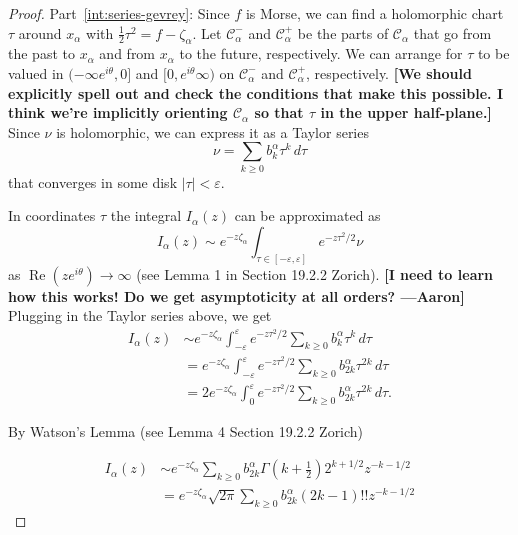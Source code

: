 \documentclass[11pt,a4paper,twoside,leqno,noamsfonts]{amsart}
\numberwithin{equation}{section}
\begin{document}
\begin{proof}
Part~\eqref{int:series-gevrey}: Since $f$ is Morse, we can find a holomorphic chart $\tau$ around $x_\alpha$ with $\tfrac{1}{2} \tau^2 = f - \zeta_\alpha$. Let $\mathcal{C}^-_\alpha$ and $\mathcal{C}^+_\alpha$ be the parts of $\mathcal{C}_\alpha$ that go from the past to $x_\alpha$ and from $x_\alpha$ to the future, respectively. We can arrange for $\tau$ to be valued in $(-\infty e^{i\theta}, 0]$ and $[0, e^{i\theta}\infty)$ on $\mathcal{C}^-_\alpha$ and $\mathcal{C}^+_\alpha$, respectively. \textbf{[We should explicitly spell out and check the conditions that make this possible. I think we're implicitly orienting $\mathcal{C}_\alpha$ so that $\tau$ in the upper half-plane.]} Since $\nu$ is holomorphic, we can express it as a Taylor series
\[ \nu = \sum_{k \ge 0} b_k^\alpha \tau^k\,d\tau \]
that converges in some disk $|\tau| < \varepsilon$.


In coordinates $\tau $ the integral $I_\alpha(z)$ can be approximated as 
\[ I_\alpha(z) \sim  e^{-z\zeta_\alpha}\int_{\tau \in [-\varepsilon, \varepsilon]} e^{-z\tau^2/2} \nu \]
as $\operatorname{Re}(ze^{i\theta}) \to \infty$ (see Lemma 1 in Section 19.2.2  Zorich). \textbf{[I need to learn how this works! Do we get asymptoticity at all orders? ---Aaron]} Plugging in the Taylor series above, we get
\begin{align*}
 I_\alpha(z) & \sim e^{-z\zeta_\alpha}\int_{-\varepsilon}^\varepsilon e^{-z\tau^2/2} \sum_{k \ge 0} b_k^\alpha \tau^k\,d\tau \\
& = e^{-z\zeta_\alpha}\int_{-\varepsilon}^\varepsilon e^{-z\tau^2/2} \sum_{k \ge 0} b_{2k}^\alpha \tau^{2k}\,d\tau\\
& = 2e^{-z\zeta_\alpha}\int_{0}^\varepsilon e^{-z\tau^2/2} \sum_{k \ge 0} b_{2k}^\alpha \tau^{2k}\,d\tau.
\end{align*}


By Watson's Lemma (see Lemma 4 Section 19.2.2 Zorich)

\begin{align*}
I_\alpha(z) &\sim e^{-z\zeta_\alpha}\sum_{k \ge 0} b_{2k}^\alpha \Gamma\left(k+\tfrac{1}{2}\right)2^{k+1/2}z^{-k-1/2}\\
&= e^{-z\zeta_\alpha}\sqrt{2\pi}\sum_{k \ge 0} b_{2k}^\alpha (2k-1)!!z^{-k-1/2}
\end{align*}




\end{proof}
\end{document}
